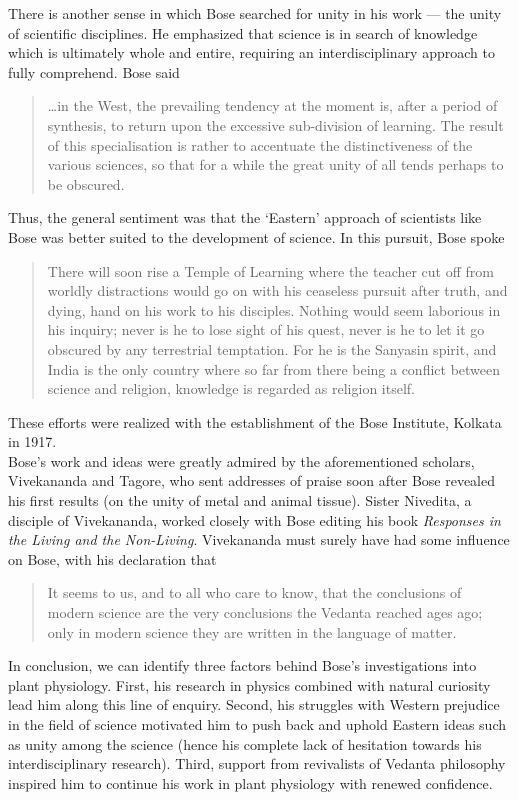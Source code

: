 \documentclass[11pt]{article}
\theoremstyle{remark}
\begin{document}
    There is another sense in which Bose searched for unity in his work --- the unity
    of scientific disciplines. He emphasized that science is in search of knowledge
    which is ultimately whole and entire, requiring an interdisciplinary approach to
    fully comprehend. Bose said 
    \begin{quote}
        \dots in the West, the prevailing tendency at the moment is, after a period of
        synthesis, to return upon the excessive sub-division of learning. The result
        of this specialisation is rather to accentuate the distinctiveness of the
        various sciences, so that for a while the great unity of all tends perhaps to
        be obscured.
    \end{quote}
    Thus, the general sentiment was that the `Eastern' approach of scientists like
    Bose was better suited to the development of science. In this pursuit, Bose spoke 
    \begin{quote}
         There will soon rise a Temple of Learning where the teacher cut off from
         worldly distractions would go on with his ceaseless pursuit after truth, and
         dying, hand on his work to his disciples. Nothing would seem laborious in
         his inquiry; never is he to lose sight of his quest, never is he to let it
         go obscured by any terrestrial temptation. For he is the Sanyasin spirit,
         and India is the only country where so far from there being a conflict
         between science and religion, knowledge is regarded as religion itself.
    \end{quote}
    These efforts were realized with the establishment of the Bose Institute,
    Kolkata in 1917. \\


    Bose's work and ideas were greatly admired by the aforementioned scholars,
    Vivekananda and Tagore, who sent addresses of praise soon after Bose revealed his
    first results (on the unity of metal and animal tissue). Sister Nivedita, a
    disciple of Vivekananda, worked closely with Bose editing his book
    \emph{Responses in the Living and the Non-Living}. Vivekananda must surely have
    had some influence on Bose, with his declaration that 
    \begin{quote}
        It seems to us, and to all who care to know, that the conclusions of modern
        science are the very conclusions the Vedanta reached ages ago; only in modern
        science they are written in the language of matter.
    \end{quote}


    In conclusion, we can identify three factors behind Bose's investigations into
    plant physiology. First, his research in physics combined with natural curiosity
    lead him along this line of enquiry. Second, his struggles with Western prejudice
    in the field of science motivated him to push back and uphold Eastern ideas such
    as unity among the science (hence his complete lack of hesitation towards his
    interdisciplinary research). Third, support from revivalists of Vedanta
    philosophy inspired him to continue his work in plant physiology with renewed
    confidence.
\end{document}
